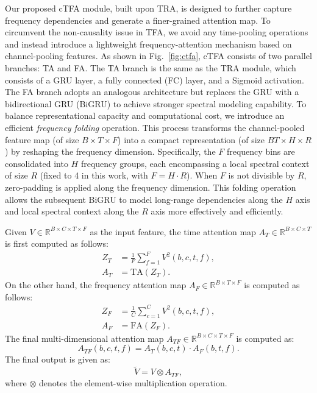 \documentclass[journal]{IEEEtran}
\newcommand{\rev}[1]{#1}
\begin{document}
Our proposed cTFA module, \rev{built upon TRA, is designed to further capture frequency dependencies and generate a finer-grained attention map. To circumvent the non-causality issue in TFA, we avoid any time-pooling operations and instead introduce a lightweight frequency-attention mechanism based on channel-pooling features.} As shown in Fig.~\ref{fig:ctfa}, \rev{cTFA} consists of two parallel branches: \rev{TA} and \rev{FA}. The \rev{TA} branch is the same as the TRA module, which consists of a GRU layer, a fully connected (FC) layer, and a Sigmoid activation. \rev{The FA branch adopts an analogous architecture but replaces the GRU with a bidirectional GRU (BiGRU) to achieve stronger spectral modeling capability. To balance representational capacity and computational cost, we introduce an efficient \textit{frequency folding} operation. This process transforms the channel-pooled feature map (of size $B \times T \times F$) into a compact representation (of size $BT \times H \times R$) by reshaping the frequency dimension. Specifically, the $F$ frequency bins are consolidated into $H$ frequency groups, each encompassing a local spectral context of size $R$ (fixed to 4 in this work, with $F=H \cdot R$). When $F$ is not divisible by $R$, zero-padding is applied along the frequency dimension.
This folding operation allows the subsequent BiGRU to model long-range dependencies along the $H$ axis and local spectral context along the $R$ axis more effectively and efficiently.}

Given $V\in \mathbb{R}^{B \times C \times T \times F}$ as the input feature, the \rev{time} attention map $A_T \in \mathbb{R}^{B\times C\times T}$ is first computed as follows:
\begin{align}
    Z_T &= \frac{1}{F} \sum_{f=1}^{F} V^2(b, c,t,f), \\
    A_{T} &= \rev{\text{TA}}(Z_T).
    \label{eq:5-6}
\end{align}
On the other hand, the \rev{frequency} attention map $A_F \in \mathbb{R}^{B\times T\times F}$ is computed as follows:
\begin{align}
    Z_F &= \frac{1}{C} \sum_{c=1}^{C} V^2(b, c,t,f), \\
    A_{F} &= \rev{\text{FA}}(Z_F).
    \label{eq:7-8}
\end{align}
The final multi-dimensional attention map $A_{TF} \in \mathbb{R}^{B\times C \times T \times F}$ is computed as:
\begin{equation}
    A_{TF}(b, c,t,f) = A_{T}(b, c,t) \cdot A_{F}(b, t,f).
    \label{eq:9}
\end{equation}
The final output is given as:
\begin{equation}
    \tilde{V}=V\otimes A_{TF},
    \label{eq:10}
\end{equation}
where $\otimes$ denotes the element-wise multiplication operation.
\end{document}
